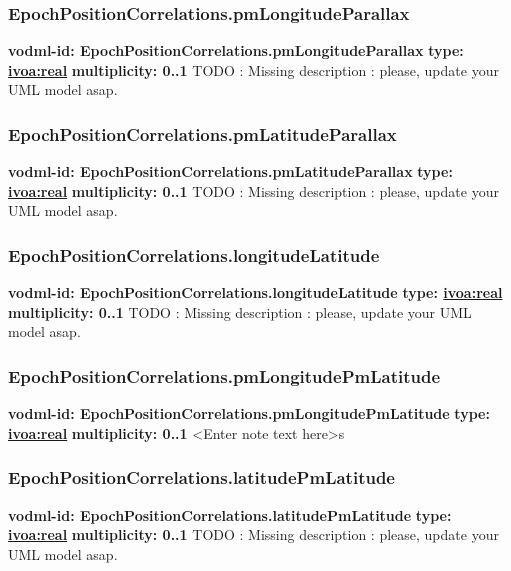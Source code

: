     \subsubsection{EpochPositionCorrelations.pmLongitudeParallax}
      \textbf{vodml-id: EpochPositionCorrelations.pmLongitudeParallax} \newline
      \textbf{type: \hyperref[sect:ivoa]{ivoa:real}} \newline
      \textbf{multiplicity: 0..1} \newline
      TODO : Missing description : please, update your UML model asap.

    \subsubsection{EpochPositionCorrelations.pmLatitudeParallax}
      \textbf{vodml-id: EpochPositionCorrelations.pmLatitudeParallax} \newline
      \textbf{type: \hyperref[sect:ivoa]{ivoa:real}} \newline
      \textbf{multiplicity: 0..1} \newline
      TODO : Missing description : please, update your UML model asap.

    \subsubsection{EpochPositionCorrelations.longitudeLatitude}
      \textbf{vodml-id: EpochPositionCorrelations.longitudeLatitude} \newline
      \textbf{type: \hyperref[sect:ivoa]{ivoa:real}} \newline
      \textbf{multiplicity: 0..1} \newline
      TODO : Missing description : please, update your UML model asap.

    \subsubsection{EpochPositionCorrelations.pmLongitudePmLatitude}
      \textbf{vodml-id: EpochPositionCorrelations.pmLongitudePmLatitude} \newline
      \textbf{type: \hyperref[sect:ivoa]{ivoa:real}} \newline
      \textbf{multiplicity: 0..1} \newline
      <Enter note text here>s

    \subsubsection{EpochPositionCorrelations.latitudePmLatitude}
      \textbf{vodml-id: EpochPositionCorrelations.latitudePmLatitude} \newline
      \textbf{type: \hyperref[sect:ivoa]{ivoa:real}} \newline
      \textbf{multiplicity: 0..1} \newline
      TODO : Missing description : please, update your UML model asap.

